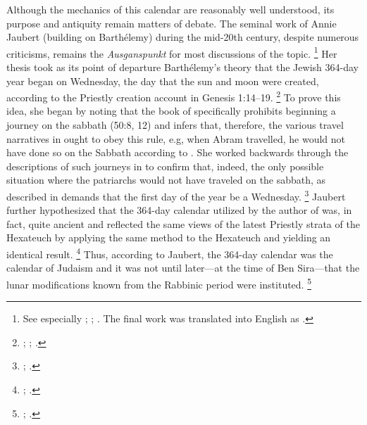 Although the mechanics of this calendar are reasonably well understood, its purpose and antiquity remain matters of debate. The seminal work of Annie Jaubert (building on Barthélemy) during the mid-20th century, despite numerous criticisms, remains the \emph{Ausganspunkt} for most discussions of the topic.%
    \footnote{See especially \cite{jaubert_vt1953}; \cite{jaubert_vt1957}; \cite{jaubert1957}. The final work was translated into English as \cite*{jaubert1965}.}
Her thesis took as its point of departure Barthélemy's theory that the Jewish 364-day year began on Wednesday, the day that the sun and moon were created, according to the Priestly creation account in Genesis 1:14--19.%
    \footnote{\cite{barthelemy_rb1952}; \cite[250]{jaubert_vt1953}; \cite[24--25]{jaubert1965}.}
To prove this idea, she began by noting that the book of \jub specifically prohibits beginning a journey on the sabbath (50:8, 12) and infers that, therefore, the various travel narratives in \jub ought to obey this rule, e.g, when Abram travelled, he would not have done so on the Sabbath according to \jub. She worked backwards through the descriptions of such journeys in \jub to confirm that, indeed, the only possible situation where the patriarchs would not have traveled on the sabbath, as described in \jub demands that the first day of the year be a Wednesday.%
    \footnote{\cite[252--254]{jaubert_vt1953}; \cite[25--27]{jaubert1965}.}
Jaubert further hypothesized that the 364-day calendar utilized by the author of \jub was, in fact, quite ancient and reflected the same views of the latest Priestly strata of the Hexateuch by applying the same method to the Hexateuch and yielding an identical result.%
    \footnote{\cite[258]{jaubert_vt1953}; \cite[33]{jaubert1965}.}
Thus, according to Jaubert, the 364-day calendar was the calendar of \secondtemple Judaism and it was not until later---at the time of Ben Sira---that the lunar modifications known from the Rabbinic period were instituted.%
    \footnote{\cite[254--258; 262--264]{jaubert_vt1953}; \cite[47--51]{jaubert1965}.}

